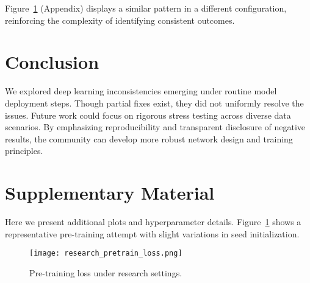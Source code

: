 Figure~\ref{fig:research_pretrain_loss} (Appendix) displays a similar pattern in a different configuration, reinforcing the complexity of identifying consistent outcomes.

\section{Conclusion}
We explored deep learning inconsistencies emerging under routine model deployment steps. Though partial fixes exist, they did not uniformly resolve the issues. Future work could focus on rigorous stress testing across diverse data scenarios. By emphasizing reproducibility and transparent disclosure of negative results, the community can develop more robust network design and training principles.

\clearpage



\appendix
\section{Supplementary Material}
Here we present additional plots and hyperparameter details. Figure~\ref{fig:research_pretrain_loss} shows a representative pre-training attempt with slight variations in seed initialization.

\begin{figure}[h]
\centering
\texttt{[image: research\_pretrain\_loss.png]}
\caption{Pre-training loss under research settings.}
\label{fig:research_pretrain_loss}
\end{figure}

